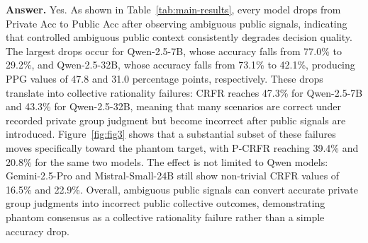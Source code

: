 \documentclass{article}
\begin{document}
\textbf{Answer.} Yes. As shown in Table~\ref{tab:main-results}, every model drops from Private Acc to Public Acc after observing ambiguous public signals, indicating that controlled ambiguous public context consistently degrades decision quality. The largest drops occur for Qwen-2.5-7B, whose accuracy falls from 77.0\% to 29.2\%, and Qwen-2.5-32B, whose accuracy falls from 73.1\% to 42.1\%, producing PPG values of 47.8 and 31.0 percentage points, respectively. These drops translate into collective rationality failures: CRFR reaches 47.3\% for Qwen-2.5-7B and 43.3\% for Qwen-2.5-32B, meaning that many scenarios are correct under recorded private group judgment but become incorrect after public signals are introduced. Figure~\ref{fig:fig3} shows that a substantial subset of these failures moves specifically toward the phantom target, with P-CRFR reaching 39.4\% and 20.8\% for the same two models. The effect is not limited to Qwen models: Gemini-2.5-Pro and Mistral-Small-24B still show non-trivial CRFR values of 16.5\% and 22.9\%. Overall, ambiguous public signals can convert accurate private group judgments into incorrect public collective outcomes, demonstrating phantom consensus as a collective rationality failure rather than a simple accuracy drop.
\end{document}
